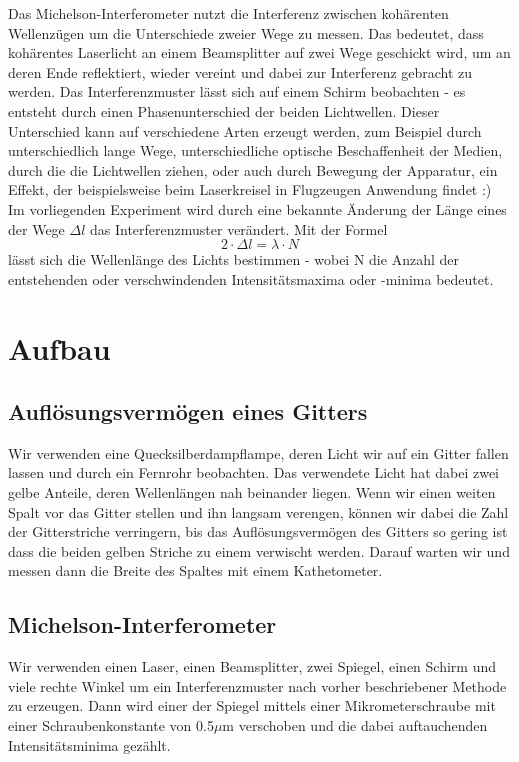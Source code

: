 \documentclass{article}
\begin{document}
Das Michelson-Interferometer nutzt die Interferenz zwischen kohärenten Wellenzügen um die Unterschiede zweier Wege zu messen. Das bedeutet, dass kohärentes Laserlicht an einem Beamsplitter auf zwei Wege geschickt wird, um an deren Ende reflektiert, wieder vereint und dabei zur Interferenz gebracht zu werden. Das Interferenzmuster lässt sich auf einem Schirm beobachten - es entsteht durch einen Phasenunterschied der beiden Lichtwellen. Dieser Unterschied kann auf verschiedene Arten erzeugt werden, zum Beispiel durch unterschiedlich lange Wege, unterschiedliche optische Beschaffenheit der Medien, durch die die Lichtwellen ziehen, oder auch durch Bewegung der Apparatur, ein Effekt, der beispielsweise beim Laserkreisel in Flugzeugen Anwendung findet :)\\
Im vorliegenden Experiment wird durch eine bekannte Änderung der Länge eines der Wege $\Delta l$ das Interferenzmuster verändert. Mit der Formel 
\begin{equation}
\label{equ:Michelson}
2\cdot \Delta l= \lambda \cdot N
\end{equation}
lässt sich die Wellenlänge des Lichts bestimmen - wobei N die Anzahl der entstehenden oder verschwindenden Intensitätsmaxima oder -minima bedeutet. 
\section{Aufbau}
\subsection{Auflösungsvermögen eines Gitters}
Wir verwenden eine Quecksilberdampflampe, deren Licht wir auf ein Gitter fallen lassen und durch ein Fernrohr beobachten. Das verwendete Licht hat dabei zwei gelbe Anteile, deren Wellenlängen nah beinander liegen. Wenn wir einen weiten Spalt vor das Gitter stellen und ihn langsam verengen, können wir dabei die Zahl der Gitterstriche verringern, bis das Auflösungsvermögen des Gitters so gering ist dass die beiden gelben Striche zu einem verwischt werden. Darauf warten wir und messen dann die Breite des Spaltes mit einem Kathetometer.
\subsection{Michelson-Interferometer}
Wir verwenden einen Laser, einen Beamsplitter, zwei Spiegel, einen Schirm und viele rechte Winkel um ein Interferenzmuster nach vorher beschriebener Methode zu erzeugen. Dann wird einer der Spiegel mittels einer Mikrometerschraube mit einer Schraubenkonstante von 0.5$\mu$m verschoben und die dabei auftauchenden Intensitätsminima gezählt. 
\end{document}
